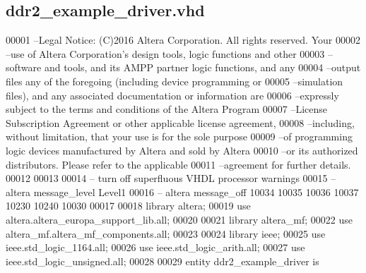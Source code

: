 \subsection{ddr2\+\_\+example\+\_\+driver.\+vhd}
\label{ddr2__example__driver_8vhd_source}

\begin{DoxyCode}
00001 \textcolor{keyword}{--Legal Notice: (C)2016 Altera Corporation. All rights reserved.  Your}
00002 \textcolor{keyword}{--use of Altera Corporation's design tools, logic functions and other}
00003 \textcolor{keyword}{--software and tools, and its AMPP partner logic functions, and any}
00004 \textcolor{keyword}{--output files any of the foregoing (including device programming or}
00005 \textcolor{keyword}{--simulation files), and any associated documentation or information are}
00006 \textcolor{keyword}{--expressly subject to the terms and conditions of the Altera Program}
00007 \textcolor{keyword}{--License Subscription Agreement or other applicable license agreement,}
00008 \textcolor{keyword}{--including, without limitation, that your use is for the sole purpose}
00009 \textcolor{keyword}{--of programming logic devices manufactured by Altera and sold by Altera}
00010 \textcolor{keyword}{--or its authorized distributors.  Please refer to the applicable}
00011 \textcolor{keyword}{--agreement for further details.}
00012 
00013 
00014 \textcolor{keyword}{-- turn off superfluous VHDL processor warnings }
00015 \textcolor{keyword}{-- altera message\_level Level1 }
00016 \textcolor{keyword}{-- altera message\_off 10034 10035 10036 10037 10230 10240 10030 }
00017 
00018 \textcolor{vhdlkeyword}{library }\textcolor{keywordflow}{altera};
00019 \textcolor{vhdlkeyword}{use }altera.altera\_europa\_support\_lib.\textcolor{keywordflow}{all};
00020 
00021 \textcolor{vhdlkeyword}{library }\textcolor{keywordflow}{altera\_mf};
00022 \textcolor{vhdlkeyword}{use }altera\_mf.altera\_mf\_components.\textcolor{keywordflow}{all};
00023 
00024 \textcolor{vhdlkeyword}{library }\textcolor{keywordflow}{ieee};
00025 \textcolor{vhdlkeyword}{use }ieee.std\_logic\_1164.\textcolor{keywordflow}{all};
00026 \textcolor{vhdlkeyword}{use }ieee.std\_logic\_arith.\textcolor{keywordflow}{all};
00027 \textcolor{vhdlkeyword}{use }ieee.std\_logic\_unsigned.\textcolor{keywordflow}{all};
00028 
00029 \textcolor{keywordflow}{entity }ddr2_example_driver \textcolor{keywordflow}{is} 

\end{DoxyCode}
